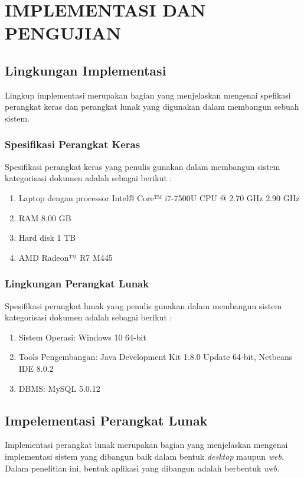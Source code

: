 \chapter{IMPLEMENTASI DAN PENGUJIAN}

%
\vspace{4.5pt}

\section{Lingkungan Implementasi}
\indent
Lingkup implementasi merupakan bagian yang menjelaskan mengenai spefikasi perangkat keras dan perangkat lunak yang digunakan dalam membangun sebuah sistem.

\subsection{Spesifikasi Perangkat Keras}
\indent
Spesifikasi perangkat keras yang penulis gunakan dalam membangun sistem kategorisasi dokumen adalah sebagai berikut :

\begin{enumerate}[nolistsep,leftmargin=0.5cm]
\item
Laptop dengan processor Intel® Core™ i7-7500U CPU @ 2.70 GHz 2.90 GHz
\item
RAM 8.00 GB
\item
Hard disk 1 TB
\item
AMD Radeon™ R7 M445
\end{enumerate}

\subsection{Lingkungan Perangkat Lunak}
\indent
Spesifikasi perangkat lunak yang penulis gunakan dalam membangun sistem kategorisasi dokumen adalah sebagai berikut :

\begin{enumerate}[nolistsep,leftmargin=0.5cm]
\item
Sistem Operasi: Windows 10 64-bit
\item
Tools Pengembangan: Java Development Kit 1.8.0 Update 64-bit, Netbeans IDE 8.0.2
\item
DBMS: MySQL 5.0.12
\end{enumerate}

\section{Impelementasi Perangkat Lunak}
\indent
Implementasi perangkat lunak merupakan bagian yang menjelaskan mengenai implementasi sistem yang dibangun baik dalam bentuk {\itshape desktop} maupun {\itshape web}. Dalam penelitian ini, bentuk aplikasi yang dibangun adalah berbentuk {\itshape web}.

